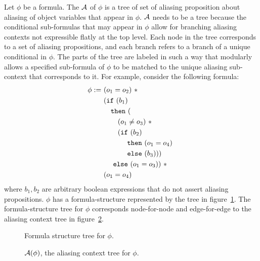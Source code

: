 Let $\phi$ be a formula.
The  $\mathcal{A}$ of $\phi$ is a tree of set of aliasing proposition about aliasing of object variables that appear in $\phi$.
$\mathcal{A}$ needs to be a tree because the conditional sub-formulas that may appear in $\phi$ allow for branching aliasing contexts not expressible flatly at the top level.
Each node in the tree corresponds to a set of aliasing propositions, and each branch refers to a branch of a unique conditional in $\phi$.
The parts of the tree are labeled in such a way that modularly allows a specified sub-formula of $\phi$ to be matched to the unique aliasing sub-context that corresponds to it.
For example, consider the following formula:
\begin{align*}
  \phi
  :=
  \  & \hspace{0em} (o_1 = o_2) \ \ast
  \\ & \hspace{0em} (\texttt{if} \ (b_1)
  \\ & \hspace{1em}    \texttt{then} \ (
  \\ & \hspace{2em}      (o_1 \neq o_3) \ \ast \
  \\ & \hspace{2em}      (\texttt{if} \ (b_2)
  \\ & \hspace{3em}        \ \texttt{then} \ (o_1 = o_4) \
  \\ & \hspace{3em}        \ \texttt{else} \ (b_3)))
  \\ & \hspace{1em}    \ \texttt{else} \ (o_1 = o_3)) \ \ast
  \\ & \hspace{0em} (o_1 = o_4)
\end{align*}
where $b_1, b_2$ are arbitrary boolean expressions that do not assert aliasing propositions.
$\phi$ has a formula-structure represented by the tree in figure~\ref{fig:aliasing-context-formula-example}.
The formula-structure tree for $\phi$ corresponds node-for-node and edge-for-edge to the aliasing context tree in figure~\ref{fig:aliasing-context-example}.
\\
%
\begin{figure}[h!]
  \label{fig:aliasing-context-formula-example}
  \caption{Formula structure tree for $\phi$.}
  \vspace{1em}
  
\end{figure}
%
\begin{figure}[h!]
  \label{fig:aliasing-context-example}
  \caption{$\mathcal{A}(\phi)$, the aliasing context tree for $\phi$.}
  \vspace{1em}
  
\end{figure}
